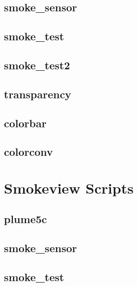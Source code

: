 \documentclass[11pt,twoside]{book}
\begin{document}
\section{smoke\_sensor}
\label{FDSsmokesensor}

\section{smoke\_test}
\label{FDSsmoketest}

\section{smoke\_test2}
\label{FDSsmoketest2}

\section{transparency}
\label{FDStransparency}

\section{colorbar}
\label{FDScolorbar}

\section{colorconv}
\label{FDScolorconv}

\chapter{Smokeview Scripts}
\label{smvscripts}

\section{plume5c}
\label{SSFplume5c}

\section{smoke\_sensor}
\label{SSFsmokesensor}

\section{smoke\_test}
\label{SSFsmoketest}
\end{document}
